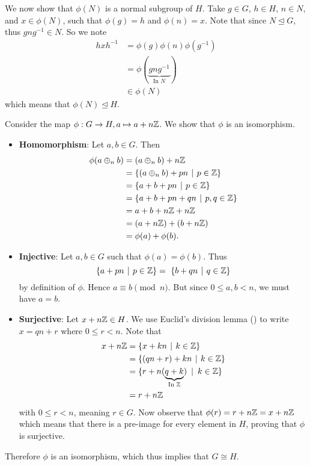 \begin{questions}
    We now show that $\phi(N)$ is a normal subgroup of $H$. Take $g \in G$, $h \in H$, $n \in N$, and $x \in \phi(N)$, such that $\phi(g) = h$ and $\phi(n) = x$. Note that since $N \unlhd G$, thus $gng^{-1} \in N$. So we note
    \begin{align*}
        hxh^{-1} &= \phi(g)\phi(n)\phi(g^{-1})\\
        &= \phi(\underbrace{gng^{-1}}_{\text{In }N})\\
        &\in \phi(N)
    \end{align*}
    which means that $\phi(N) \unlhd H$.

    \item Consider the map $\phi: G \to H, a \mapsto a + n\mathbb{Z}$. We show that $\phi$ is an isomorphism.
    \begin{itemize}
        \item \textbf{Homomorphism}: Let $a, b \in G$. Then
        \begin{align*}
            \phi(a\oplus_n b) &= (a\oplus_n b) + n\Z\\
            &= \{(a \oplus_n b) + pn \vert p \in \Z\}\\
            &= \{a+b + pn \vert p \in \Z\}\\
            &= \{a+b + pn + qn\vert p, q \in \Z\}\\
            &= a+b+n\Z + n\Z\\
            &= (a+n\Z) + (b + n\Z)\\
            &= \phi(a) + \phi(b).
        \end{align*}
        \item \textbf{Injective}: Let $a, b \in G$ such that $\phi(a) = \phi(b)$. Thus
        \[
            \{a + pn \vert p \in \Z \} = \ \{b + qn \vert q \in \Z \}
        \]
        by definition of $\phi$. Hence $a \equiv b \pmod n$. But since $0 \leq a, b < n$, we must have $a = b$.
        \item \textbf{Surjective}: Let $x + n\mathbb{Z} \in H$. We use Euclid's division lemma () to write $x = qn + r$ where $0 \leq r < n$. Note that
        \begin{align*}
            x + n\Z &= \{x + kn \vert k \in \Z\}\\
            &= \{(qn + r) + kn \vert k \in \Z\}\\
            &= \{r + n(\underbrace{q + k}_{\text{In }\Z}) \vertalt k \in \Z \}\\
            &= r + n\Z
        \end{align*}
        with $0 \leq r < n$, meaning $r \in G$. Now observe that $\phi(r) = r+n\mathbb{Z} = x+n\mathbb{Z}$ which means that there is a pre-image for every element in $H$, proving that $\phi$ is surjective.
    \end{itemize}
    Therefore $\phi$ is an isomorphism, which thus implies that $G \cong H$.


\end{questions}
